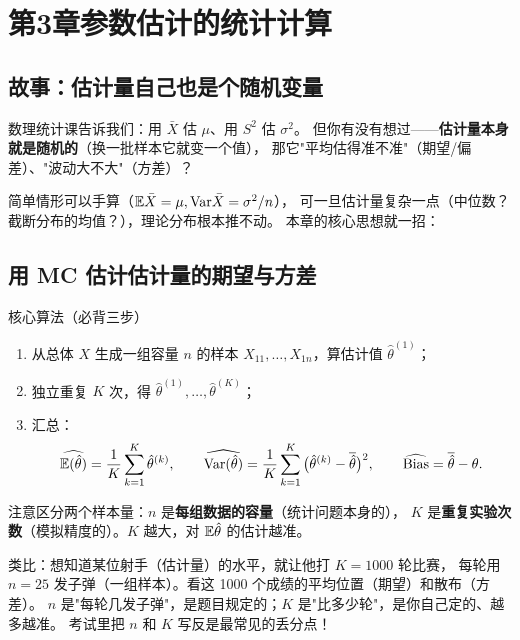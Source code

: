 \section{第3章\quad 参数估计的统计计算}

\subsection{故事：估计量自己也是个随机变量}

数理统计课告诉我们：用 $\bar X$ 估 $\mu$、用 $S^2$ 估 $\sigma^2$。
但你有没有想过——\textbf{估计量本身就是随机的}（换一批样本它就变一个值），
那它"平均估得准不准"（期望/偏差）、"波动大不大"（方差）？

简单情形可以手算（$\mathbb{E}\bar X=\mu,\mathrm{Var}\bar X=\sigma^2/n$），
可一旦估计量复杂一点（中位数？截断分布的均值？），理论分布根本推不动。
本章的核心思想就一招：

\begin{center}
\end{center}

\subsection{用 MC 估计估计量的期望与方差}

\begin{ebox}{核心算法（必背三步）}
\begin{enumerate}[leftmargin=2em]
  \item 从总体 $X$ 生成一组容量 $n$ 的样本 $X_{11},\dots,X_{1n}$，算估计值
  $\hat\theta^{(1)}$；
  \item 独立重复 $K$ 次，得 $\hat\theta^{(1)},\dots,\hat\theta^{(K)}$；
  \item 汇总：
  \[
  \widehat{\mathbb{E}(\hat\theta)}=\frac1K\sum_{k=1}^K\hat\theta^{(k)},\qquad
  \widehat{\mathrm{Var}(\hat\theta)}=\frac1K\sum_{k=1}^K\big(\hat\theta^{(k)}-\overline{\hat\theta}\big)^2,\qquad
  \widehat{\mathrm{Bias}}=\overline{\hat\theta}-\theta .
  \]
\end{enumerate}
注意区分两个样本量：$n$ 是\textbf{每组数据的容量}（统计问题本身的），
$K$ 是\textbf{重复实验次数}（模拟精度的）。$K$ 越大，对 $\mathbb{E}\hat\theta$ 的估计越准。
\end{ebox}

\begin{pbox}
类比：想知道某位射手（估计量）的水平，就让他打 $K=1000$ 轮比赛，
每轮用 $n=25$ 发子弹（一组样本）。看这 1000 个成绩的平均位置（期望）和散布（方差）。
$n$ 是"每轮几发子弹"，是题目规定的；$K$ 是"比多少轮"，是你自己定的、越多越准。
考试里把 $n$ 和 $K$ 写反是最常见的丢分点！
\end{pbox}

